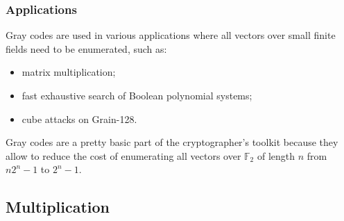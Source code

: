 \documentclass[11pt]{beamer}
\newcommand{\field}[1]{\mathbb{#1}}
\newcommand{\F}{\ensuremath{\field{F}}\xspace}
\begin{document}
\begin{frame}
\frametitle{Applications} 

Gray codes are used in various applications where all vectors over small finite fields need to be enumerated, such as:

\begin{itemize}
 \item matrix multiplication;
 \item fast exhaustive search of Boolean polynomial systems;
 \item cube attacks on Grain-128.
\end{itemize}

\begin{block}{}
Gray codes are a pretty basic part of the cryptographer's toolkit because they allow to reduce the cost of enumerating all vectors over $\F_2$ of length $n$ from $n2^n-1$ to $2^n-1$.
\end{block}
\end{frame}

\subsection{Multiplication}
\end{document}
